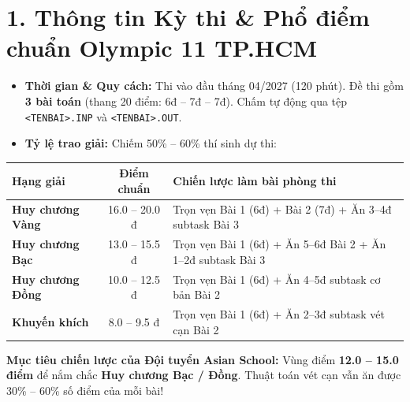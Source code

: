 \documentclass[11pt,a4paper]{article}
\begin{document}
\vspace{-0.2cm}
\section*{\color{AsianDarkBlue}\normalsize 1. Thông tin Kỳ thi \& Phổ điểm chuẩn Olympic 11 TP.HCM}
\vspace{-0.1cm}
\begin{itemize}
    \setlength{\itemsep}{1.5pt}
    \small
    \item \textbf{Thời gian \& Quy cách:} Thi vào đầu tháng 04/2027 (120 phút). Đề thi gồm \textbf{3 bài toán} (thang 20 điểm: 6đ -- 7đ -- 7đ). Chấm tự động qua tệp \texttt{<TENBAI>.INP} và \texttt{<TENBAI>.OUT}.
    \item \textbf{Tỷ lệ trao giải:} Chiếm 50\% -- 60\% thí sinh dự thi:
\end{itemize}

\vspace{-0.2cm}
\begin{center}
\footnotesize
\begin{tabular}{@{}lcp{8.5cm}@{}}
\toprule
\textbf{Hạng giải} & \textbf{Điểm chuẩn} & \textbf{Chiến lược làm bài phòng thi} \\
\midrule
\textbf{Huy chương Vàng} & 16.0 -- 20.0 đ & Trọn vẹn Bài 1 (6đ) + Bài 2 (7đ) + Ăn 3--4đ subtask Bài 3 \\
\textbf{Huy chương Bạc} & 13.0 -- 15.5 đ & Trọn vẹn Bài 1 (6đ) + Ăn 5--6đ Bài 2 + Ăn 1--2đ subtask Bài 3 \\
\textbf{Huy chương Đồng} & 10.0 -- 12.5 đ & Trọn vẹn Bài 1 (6đ) + Ăn 4--5đ subtask cơ bản Bài 2 \\
\textbf{Khuyến khích} & 8.0 -- 9.5 đ & Trọn vẹn Bài 1 (6đ) + Ăn 2--3đ subtask vét cạn Bài 2 \\
\bottomrule
\end{tabular}
\end{center}

\vspace{-0.1cm}
\begin{tcolorbox}[colback=white,colframe=AsianDarkBlue,arc=1mm,boxrule=0.5pt]
\footnotesize\textbf{Mục tiêu chiến lược của Đội tuyển Asian School:} Vùng điểm \textbf{12.0 -- 15.0 điểm} để nắm chắc \textbf{Huy chương Bạc / Đồng}. Thuật toán vét cạn vẫn ăn được 30\% -- 60\% số điểm của mỗi bài!
\end{tcolorbox}

\vspace{-0.2cm}
\end{document}
